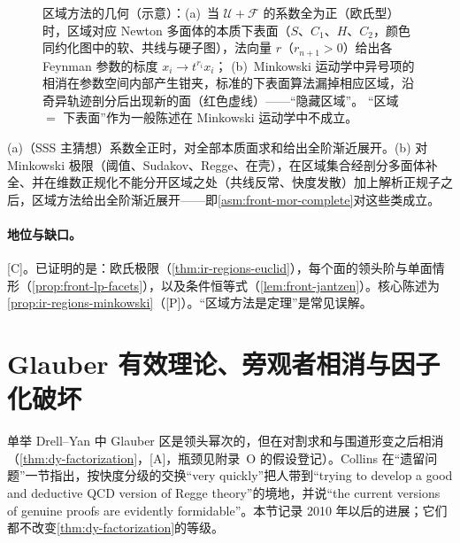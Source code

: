 \begin{figure}[htbp]
\caption{区域方法的几何（示意）：(a)~当 $\mathcal U+\mathcal F$ 的系数全为正（欧氏型）时，区域对应 Newton 多面体的本质下表面（$S$、$C_1$、$H$、$C_2$，颜色同约化图中的软、共线与硬子图），法向量 $r$（$r_{n+1}>0$）给出各 Feynman 参数的标度 $x_i\to t^{r_i}x_i$；
(b)~Minkowski 运动学中异号项的相消在参数空间内部产生钳夹，标准的下表面算法漏掉相应区域，沿奇异轨迹剖分后出现新的面（红色虚线）——“隐藏区域”\cite{Gardi:2024axt}。
“区域 $=$ 下表面”作为一般陈述在 Minkowski 运动学中不成立。}
\label{fig:front-regions-polytope}
\end{figure}

\begin{conjecture}\label{conj:front-mor-minkowski}
(a)（SSS 主猜想\cite{Semenova:2018cwy}）系数全正时，对全部本质面求和给出全阶渐近展开。(b) 对 Minkowski 极限（阈值、Sudakov、Regge、在壳），在区域集合经剖分多面体补全、并在维数正规化不能分开区域之处（共线反常、快度发散）加上解析正规子之后，区域方法给出全阶渐近展开——即\cref{asm:front-mor-complete}对这些类成立。
\end{conjecture}

\paragraph{地位与缺口。}[C]。已证明的是：欧氏极限（\cref{thm:ir-regions-euclid}），每个面的领头阶与单面情形（\cref{prop:front-lp-facets}），以及条件恒等式（\cref{lem:front-jantzen}）。核心陈述为\cref{prop:ir-regions-minkowski}（[P]）。“区域方法是定理”是常见误解。

\section{Glauber 有效理论、旁观者相消与因子化破坏}\label{sec:front-glauber}

单举 Drell--Yan 中 Glauber 区是领头幂次的，但在对割求和与围道形变之后相消\cite{Bodwin1985,CollinsSoperSterman1985b,CollinsSoperSterman1988}（\cref{thm:dy-factorization}，[A]，瓶颈见附录~O 的假设登记）。Collins 在“遗留问题”一节\cite[第~14.4.8~节，第~561--562~页]{Collins2011}指出，按快度分级的交换“very quickly”把人带到“trying to develop a good and deductive QCD version of Regge theory”的境地，并说“the current versions of genuine proofs are evidently formidable”。本节记录 2010 年以后的进展；它们都不改变\cref{thm:dy-factorization}的等级。

